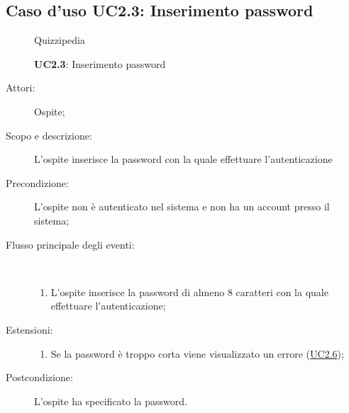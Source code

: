 \subsection{Caso d'uso UC2.3: Inserimento password}
	\begin{figure}[H]
		\centering
		\begin{resizedtikzpicture}{\textwidth}
		\begin{umlsystem}[x=0, fill=lightgray!20]{Quizzipedia}
		\end{umlsystem}
		\end{resizedtikzpicture}
		\caption{\textbf{UC2.3}: Inserimento password}
		\label{UC2.3}
	\end{figure}
\begin{description}
\item[Attori:] Ospite;
\item[Scopo e descrizione:] L'ospite inserisce la password con la quale effettuare l'autenticazione
      \item[Precondizione:] L'ospite non è autenticato nel sistema e non ha un account presso il sistema;

        \item[Flusso principale degli eventi:] \ 
 \begin{enumerate}
          \item L'ospite inserisce la password di almeno 8 caratteri con la quale effettuare l'autenticazione;

      \end{enumerate}
    \item[Estensioni:]
      \begin{enumerate}
          \item Se la password è troppo corta viene visualizzato un errore	 (\hyperlink{UC2.6}{UC2.6});

      \end{enumerate}
    \item[Postcondizione:] L'ospite ha specificato la password.
  \end{description}
\hypertarget{UC2.4}{}
